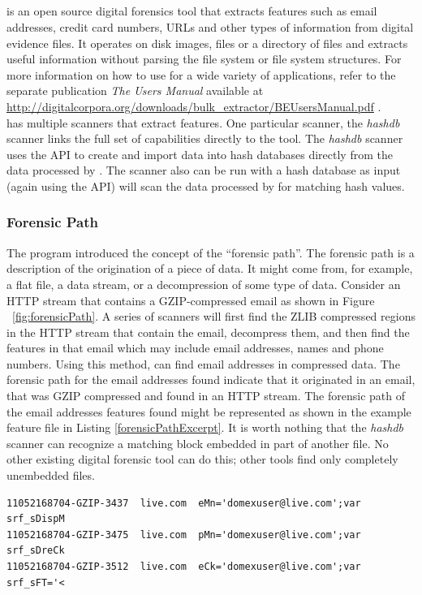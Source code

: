 \documentclass[11pt,fleqn]{article} %
\begin{document}
\subsection{\bulk}
\bulk is an open source digital forensics tool that extracts features such as email addresses, credit card numbers, URLs and other types of information from digital evidence files. It operates on disk images, files or a directory of files and extracts useful information without parsing the file system or file system structures.  For more information on how to use \bulk for a wide variety of applications, refer to the separate publication \textit{The \bulk Users Manual} available at \url{http://digitalcorpora.org/downloads/bulk_extractor/BEUsersManual.pdf} \cite{beusersguide}.\\

\bulk has multiple scanners that extract features. One particular scanner, the \textit{hashdb} scanner links the full set of \bulk capabilities directly to the \hash tool. The \textit{hashdb} scanner uses the \hash API to create and import data into hash databases  directly from the data processed by \bulk. The scanner also can be run with a hash database as input (again using the \hash API) will scan the data processed by \bulk for matching hash values.\\

\subsubsection{Forensic Path}
The \bulk program introduced the concept of the ``forensic path''. The forensic path is a description of the origination of a piece of data. It might come from, for example, a flat file, a data stream, or a decompression of some type of data. Consider an HTTP stream that contains a GZIP-compressed email as shown in Figure ~\ref{fig:forensicPath}. A series of \bulk scanners will first find the ZLIB compressed regions in the HTTP stream that contain the email, decompress them, and then find the features in that email which may include email addresses, names and phone numbers. Using this method, \bulk can find email addresses in compressed data. The forensic path for the email addresses found indicate that it originated in an email, that was GZIP compressed and found in an HTTP stream. The forensic path of the email addresses features found might be represented as shown in the example feature file in Listing \ref{forensicPathExcerpt}. It is worth nothing that the \textit{hashdb} scanner can recognize a matching block embedded in part of another file. No other existing digital forensic tool can do this; other tools find only completely unembedded files.\\
\lstset{style=customfile}
\begin{lstlisting}[float, caption=Forensic Path of email address features found in \bulk, label=forensicPathExcerpt]
11052168704-GZIP-3437  live.com  eMn='domexuser@live.com';var  srf_sDispM
11052168704-GZIP-3475  live.com  pMn='domexuser@live.com';var  srf_sDreCk
11052168704-GZIP-3512  live.com  eCk='domexuser@live.com';var  srf_sFT='<
\end{lstlisting}
\end{document}
